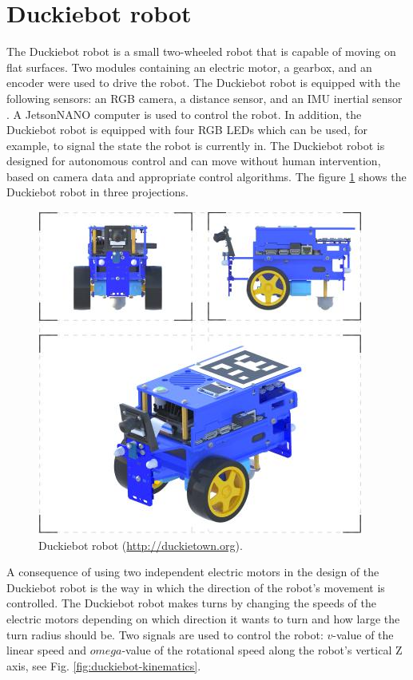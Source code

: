 \documentclass[conference]{IEEEtran}
\begin{document}

\section{Duckiebot robot}\label{sec:robot-duckiebot}
The Duckiebot robot is a small two-wheeled robot that is capable of moving on flat surfaces. Two modules containing an electric motor, a gearbox, and an encoder were used to drive the robot. The Duckiebot robot is equipped with the following sensors: an RGB camera, a distance sensor, and an IMU inertial sensor \cite{gupta2022low}. A JetsonNANO computer is used to control the robot. In addition, the Duckiebot robot is equipped with four RGB LEDs which can be used, for example, to signal the state the robot is currently in. The Duckiebot robot is designed for autonomous control and can move without human intervention, based on camera data and appropriate control algorithms. The figure \ref{fig:duckiebot-3d} shows the Duckiebot robot in three projections.

\begin{figure}[h]
    \centering
    \includegraphics[width=.9\columnwidth]{duckiebot-blue-3d}
    \caption{Duckiebot robot (\url{http://duckietown.org}).}
    \label{fig:duckiebot-3d}
\end{figure}

A consequence of using two independent electric motors in the design of the Duckiebot robot is the way in which the direction of the robot's movement is controlled.
The Duckiebot robot makes turns by changing the speeds of the electric motors depending on which direction it wants to turn and how large the turn radius should be.
Two signals are used to control the robot: $v$-value of the linear speed and $omega$-value of the rotational speed along the robot's vertical Z axis, see Fig. \ref{fig:duckiebot-kinematics}.
\end{document}
